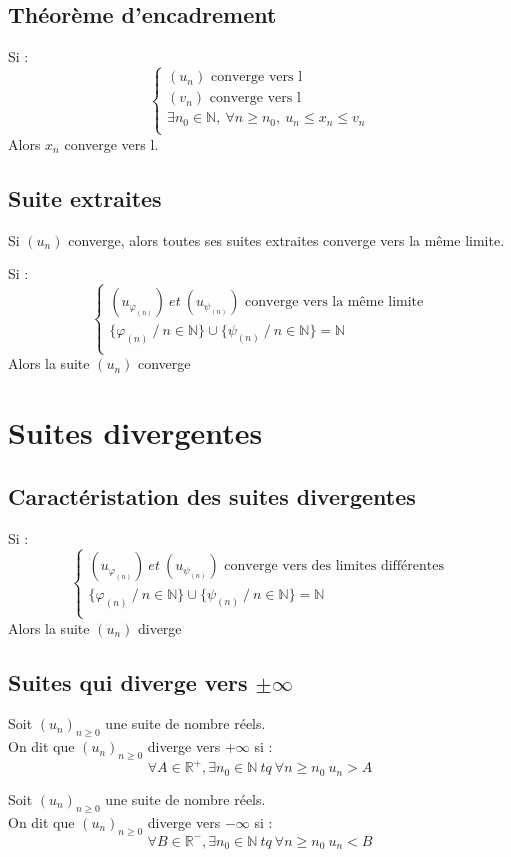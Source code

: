 \subsection{Théorème d'encadrement}
Si : 
$$\left\{\begin{array}{l}
    (u_n) \mbox{ converge vers l}\\
    (v_n) \mbox{ converge vers l}\\
    \exists n_0 \in \mathbb{N},~ \forall n\geq n_0,~ u_n\leq x_n \leq v_n\\
  \end{array}\right.$$
Alors $x_n$ converge vers l.
\subsection{Suite extraites}
\begin{prop}
 Si $(u_n)$ converge, alors toutes ses suites extraites converge vers la même limite.
\end{prop}
\begin{prop}
Si :
$$\left\{\begin{array}{l}
    (u_{\varphi_{(n)}})~ et~ (u_{\psi_{(n)}})\mbox{ converge vers la même limite}\\
    \{\varphi_{(n)}~ /~ n\in \mathbb{N}\} \cup   \{\psi_{(n)}~ /~ n\in \mathbb{N}\} = \mathbb{N}\\
  \end{array}\right.$$
Alors la suite $(u_n)$ converge
\end{prop}

\section{Suites divergentes}
\subsection{Caractéristation des suites divergentes}
Si :
$$\left\{\begin{array}{l}
    (u_{\varphi_{(n)}})~ et~ (u_{\psi_{(n)}})\mbox{ converge vers des limites différentes}\\
    \{\varphi_{(n)}~ /~ n\in \mathbb{N}\} \cup   \{\psi_{(n)}~ /~ n\in \mathbb{N}\} = \mathbb{N}\\
  \end{array}\right.$$
Alors la suite $(u_n)$ diverge

\subsection{Suites qui diverge vers $\pm\infty$}
\begin{de}
Soit $(u_n)_{n \geq 0}$ une suite de nombre réels.\\
On dit que $(u_n)_{n \geq 0}$ diverge vers $+\infty$ si :
$$\forall A \in \mathbb{R}^+, \exists n_0 \in \mathbb{N}~ tq~ \forall n \geq n_0~ u_n>A$$
\end{de}
\begin{de}
Soit $(u_n)_{n \geq 0}$ une suite de nombre réels.\\
On dit que $(u_n)_{n \geq 0}$ diverge vers $-\infty$ si :
$$\forall B \in \mathbb{R}^-, \exists n_0 \in \mathbb{N}~ tq~ \forall n \geq n_0~ u_n<B$$
\end{de}
